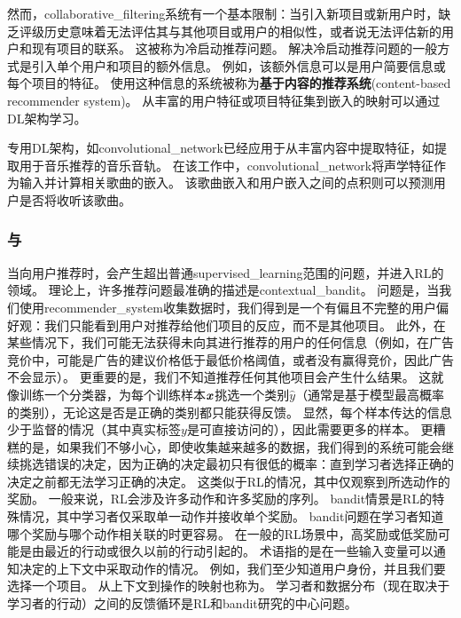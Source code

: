 然而，\gls{collaborative_filtering}系统有一个基本限制：当引入新项目或新用户时，缺乏评级历史意味着无法评估其与其他项目或用户的相似性，或者说无法评估新的用户和现有项目的联系。
这被称为冷启动推荐问题。
解决冷启动推荐问题的一般方式是引入单个用户和项目的额外信息。
例如，该额外信息可以是用户简要信息或每个项目的特征。
使用这种信息的系统被称为\textbf{基于内容的推荐系统}(content-based recommender system)。
从丰富的用户特征或项目特征集到嵌入的映射可以通过\gls{DL}架构学习\citep{Huang-et-al-2013,Elkahky-et-al-2015}。

专用\gls{DL}架构，如\gls{convolutional_network}已经应用于从丰富内容中提取特征，如提取用于音乐推荐的音乐音轨\citep{vandenOord-et-al-NIPS2013}。
在该工作中，\gls{convolutional_network}将声学特征作为输入并计算相关歌曲的嵌入。
该歌曲嵌入和用户嵌入之间的点积则可以预测用户是否将收听该歌曲。


\subsubsection{与}
当向用户推荐时，会产生超出普通\gls{supervised_learning}范围的问题，并进入\gls{RL}的领域。
理论上，许多推荐问题最准确的描述是\gls{contextual_bandit}\citep{Langford+Zhang-NIPS2008,Lu-et-al-2010}。
问题是，当我们使用\gls{recommender_system}收集数据时，我们得到是一个有偏且不完整的用户偏好观：我们只能看到用户对推荐给他们项目的反应，而不是其他项目。
此外，在某些情况下，我们可能无法获得未向其进行推荐的用户的任何信息（例如，在广告竞价中，可能是广告的建议价格低于最低价格阈值，或者没有赢得竞价，因此广告不会显示）。
更重要的是，我们不知道推荐任何其他项目会产生什么结果。
这就像训练一个分类器，为每个训练样本$\boldsymbol{\mathit{x}}$挑选一个类别$\hat y$（通常是基于模型最高概率的类别），无论这是否是正确的类别都只能获得反馈。
显然，每个样本传达的信息少于监督的情况（其中真实标签$y$是可直接访问的），因此需要更多的样本。
更糟糕的是，如果我们不够小心，即使收集越来越多的数据，我们得到的系统可能会继续挑选错误的决定，因为正确的决定最初只有很低的概率：直到学习者选择正确的决定之前都无法学习正确的决定。
这类似于\gls{RL}的情况，其中仅观察到所选动作的奖励。
一般来说，\gls{RL}会涉及许多动作和许多奖励的序列。
\gls{bandit}情景是\gls{RL}的特殊情况，其中学习者仅采取单一动作并接收单个奖励。
\gls{bandit}问题在学习者知道哪个奖励与哪个动作相关联的时更容易。
在一般的\gls{RL}场景中，高奖励或低奖励可能是由最近的行动或很久以前的行动引起的。
术语指的是在一些输入变量可以通知决定的上下文中采取动作的情况。
例如，我们至少知道用户身份，并且我们要选择一个项目。
从上下文到操作的映射也称为。
学习者和数据分布（现在取决于学习者的行动）之间的反馈循环是\gls{RL}和\gls{bandit}研究的中心问题。

